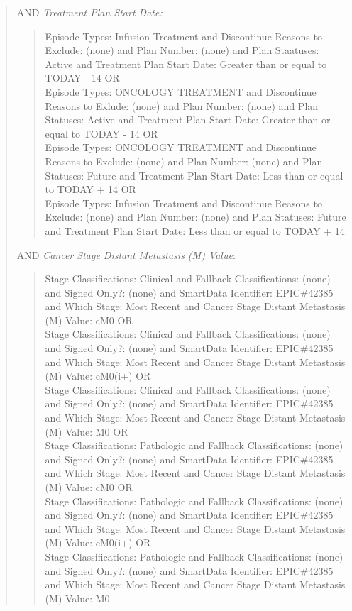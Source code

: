 \documentclass[
]{book}
\begin{document}
\begin{quote}
AND \emph{Treatment Plan Start Date:}\\

\begin{quote}
Episode Types: Infusion Treatment and Discontinue Reasons to Exclude: (none) and Plan Number: (none) and Plan Staatuses: Active and Treatment Plan Start Date: Greater than or equal to TODAY - 14 OR\\
Episode Types: ONCOLOGY TREATMENT and Discontinue Reasons to Exlude: (none) and Plan Number: (none) and Plan Statuses: Active and Treatment Plan Start Date: Greater than or equal to TODAY - 14 OR\\
Episode Types: ONCOLOGY TREATMENT and Discontinue Reasons to Exclude: (none) and Plan Number: (none) and Plan Statuses: Future and Treatment Plan Start Date: Less than or equal to TODAY + 14 OR\\
Episode Types: Infusion Treatment and Discontinue Reasons to Exclude: (none) and Plan Number: (none) and Plan Statuses: Future and Treatment Plan Start Date: Less than or equal to TODAY + 14\\
\end{quote}

AND \emph{Cancer Stage Distant Metastasis (M) Value}:\\

\begin{quote}
Stage Classifications: Clinical and Fallback Classifications: (none) and Signed Only?: (none) and SmartData Identifier: EPIC\#42385 and Which Stage: Most Recent and Cancer Stage Distant Metastasis (M) Value: cM0 OR\\
Stage Classifications: Clinical and Fallback Classifications: (none) and Signed Only?: (none) and SmartData Identifier: EPIC\#42385 and Which Stage: Most Recent and Cancer Stage Distant Metastasis (M) Value: cM0(i+) OR\\
Stage Classifications: Clinical and Fallback Classifications: (none) and Signed Only?: (none) and SmartData Identifier: EPIC\#42385 and Which Stage: Most Recent and Cancer Stage Distant Metastasis (M) Value: M0 OR\\
Stage Classifications: Pathologic and Fallback Classifications: (none) and Signed Only?: (none) and SmartData Identifier: EPIC\#42385 and Which Stage: Most Recent and Cancer Stage Distant Metastasis (M) Value: cM0 OR\\
Stage Classifications: Pathologic and Fallback Classifications: (none) and Signed Only?: (none) and SmartData Identifier: EPIC\#42385 and Which Stage: Most Recent and Cancer Stage Distant Metastasis (M) Value: cM0(i+) OR\\
Stage Classifications: Pathologic and Fallback Classifications: (none) and Signed Only?: (none) and SmartData Identifier: EPIC\#42385 and Which Stage: Most Recent and Cancer Stage Distant Metastasis (M) Value: M0\\
\end{quote}


\end{quote}
\end{document}
